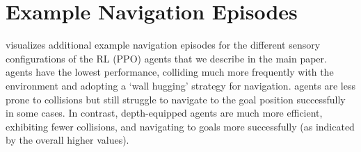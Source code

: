 \section{Example Navigation Episodes}

 visualizes additional example navigation episodes for the different sensory configurations of the RL (PPO) agents that we describe in the main paper.
\blind agents have the lowest performance, colliding much more frequently with the environment and adopting a `wall hugging' strategy for navigation.
\rgb agents are less prone to collisions but still struggle to navigate to the goal position successfully in some cases.
In contrast, depth-equipped agents are much more efficient, exhibiting fewer collisions, and navigating to goals more successfully (as indicated by the overall higher \spl values).


